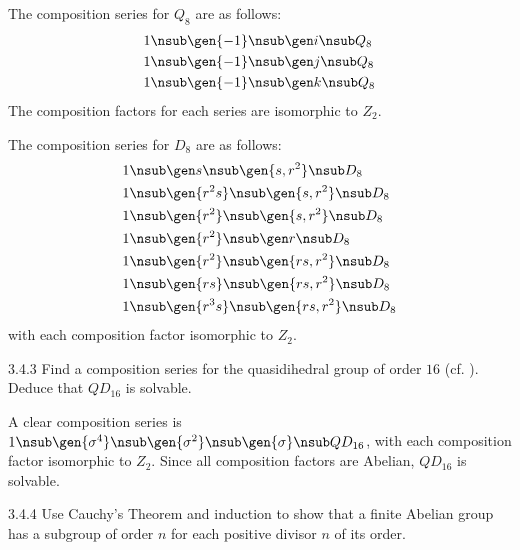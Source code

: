 \begin{sol}
    The composition series for $Q_8$ are as follows:
    \begin{align*}
        1 & \nsub \gen{-1} \nsub \gen i \nsub Q_8 \\
        1 & \nsub \gen{-1} \nsub \gen j \nsub Q_8 \\
        1 & \nsub \gen{-1} \nsub \gen k \nsub Q_8
    \end{align*}
    The composition factors for each series are isomorphic to $Z_2$.

    The composition series for $D_8$ are as follows:
    \begin{align*}
        1 & \nsub \gen s \nsub \gen{s, r^2} \nsub D_8 \\
        1 & \nsub \gen{r^2s} \nsub \gen{s, r^2} \nsub D_8 \\
        1 & \nsub \gen{r^2} \nsub \gen{s, r^2} \nsub D_8 \\
        1 & \nsub \gen{r^2} \nsub \gen r \nsub D_8 \\
        1 & \nsub \gen{r^2} \nsub \gen{rs, r^2} \nsub D_8 \\
        1 & \nsub \gen{rs} \nsub \gen{rs, r^2} \nsub D_8 \\
        1 & \nsub \gen{r^3s} \nsub \gen{rs, r^2} \nsub D_8
    \end{align*}
    with each composition factor isomorphic to $Z_2$.
\end{sol}

\begin{exercise}{3.4.3}
    Find a composition series for the quasidihedral group of order $16$ (cf. ).
	Deduce that $QD_{16}$ is solvable.
\end{exercise}

\begin{sol}
    A clear composition series is $1 \nsub \gen{\sigma^4} \nsub \gen{\sigma^2} \nsub \gen{\sigma} \nsub QD_{16}$, with each composition factor isomorphic to $Z_2$.
	Since all composition factors are Abelian, $QD_{16}$ is solvable.
\end{sol}

\begin{exercise}{3.4.4}
    Use Cauchy's Theorem and induction to show that a finite Abelian group has a subgroup of order $n$ for each positive divisor $n$ of its order.
\end{exercise}

